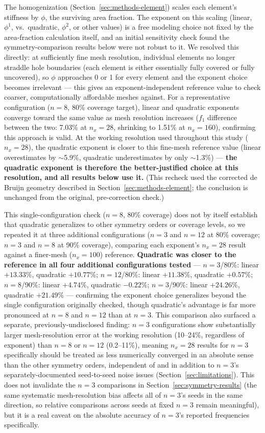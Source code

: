 \documentclass[11pt]{article}
\begin{document}
The homogenization (Section~\ref{sec:methods-element}) scales each element's stiffness by $\phi$, the surviving area fraction. The exponent on this scaling (linear, $\phi^1$, vs.\ quadratic, $\phi^2$, or other values) is a free modeling choice not fixed by the area-fraction calculation itself, and an initial sensitivity check found the symmetry-comparison results below were not robust to it. We resolved this directly: at sufficiently fine mesh resolution, individual elements no longer straddle hole boundaries (each element is either essentially fully covered or fully uncovered), so $\phi$ approaches 0 or 1 for every element and the exponent choice becomes irrelevant --- this gives an exponent-independent reference value to check coarser, computationally affordable meshes against. For a representative configuration ($n=8$, 80\% coverage target), linear and quadratic exponents converge toward the same value as mesh resolution increases ($f_1$ difference between the two: 7.03\% at $n_x=28$, shrinking to 1.51\% at $n_x=160$), confirming this approach is valid. At the working resolution used throughout this study ($n_x=28$), the quadratic exponent is closer to this fine-mesh reference value (linear overestimates by $\sim$5.9\%, quadratic underestimates by only $\sim$1.3\%) --- \textbf{the quadratic exponent is therefore the better-justified choice at this resolution, and all results below use it.} (This recheck used the corrected de Bruijn geometry described in Section~\ref{sec:methods-element}; the conclusion is unchanged from the original, pre-correction check.)

This single-configuration check ($n=8$, 80\% coverage) does not by itself establish that quadratic generalizes to other symmetry orders or coverage levels, so we repeated it at three additional configurations ($n=3$ and $n=12$ at 80\% coverage; $n=3$ and $n=8$ at 90\% coverage), comparing each exponent's $n_x=28$ result against a finer-mesh ($n_x=100$) reference. \textbf{Quadratic was closer to the reference in all four additional configurations tested} --- $n=3$/80\%: linear $+13.33\%$, quadratic $+10.77\%$; $n=12$/80\%: linear $+11.38\%$, quadratic $+0.57\%$; $n=8$/90\%: linear $+4.74\%$, quadratic $-0.22\%$; $n=3$/90\%: linear $+24.26\%$, quadratic $+21.49\%$ --- confirming the exponent choice generalizes beyond the single configuration originally checked, though quadratic's advantage is far more pronounced at $n=8$ and $n=12$ than at $n=3$. This comparison also surfaced a separate, previously-undisclosed finding: $n=3$ configurations show substantially larger mesh-resolution error at the working resolution (10--24\%, regardless of exponent) than $n=8$ or $n=12$ (0.2--11\%), meaning $n_x=28$ results for $n=3$ specifically should be treated as less numerically converged in an absolute sense than the other symmetry orders, independent of and in addition to $n=3$'s separately-documented seed-to-seed noise issues (Section~\ref{sec:limitations}). This does not invalidate the $n=3$ comparisons in Section~\ref{sec:symmetry-results} (the same systematic mesh-resolution bias affects all of $n=3$'s seeds in the same direction, so relative comparisons across seeds at fixed $n=3$ remain meaningful), but it is a real caveat on the absolute accuracy of $n=3$'s reported frequencies specifically.
\end{document}
